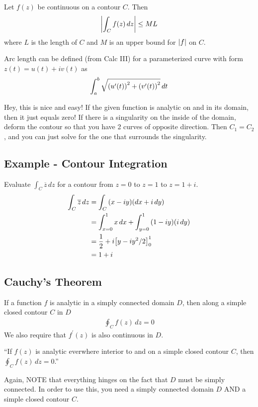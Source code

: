     \begin{thm}
        Let $f(z)$ be continuous on a contour $C$. Then
        \begin{align*}
            \left\lvert \int_C f(z) \, dz \right\rvert \le ML
        \end{align*}
        where $L$ is the length of $C$ and $M$ is an upper bound for
        $\left\lvert f \right\rvert$ on $C$.

        Arc length can be defined (from Calc III) for a parameterized curve
        with form $z(t) = u(t) + i v(t)$ as
        \begin{align*}
            \int_a^b \sqrt{{\left( u^\prime(t) \right)}^2 + {\left( v^\prime(t) \right)}^2} \, dt
        \end{align*}
    \end{thm}

    Hey, this is nice and easy! If the given function is analytic on and in
    its domain, then it just equals zero! If there is a singularity on the
    inside of the domain, deform the contour so that you have 2 curves of
    opposite direction. Then $C_1 = C_2$, and you can just solve for the one
    that surrounds the singularity.

    \subsection{Example - Contour Integration}
    Evaluate $\int_C \overline{z} \, dz$ for a contour from $z=0$ to $z=1$
    to $z=1+i$.
    \begin{align*}
        \int_C\overline{z}\,dz &= \int_C {\left( x - iy \right)}{\left( dx + i \, dy \right)}\\
        &= \int_{x=0}^1 x \, dx + \int_{y=0}^1 {\left( 1 - iy \right)}{\left( i \, dy \right)}\\
        &= \frac{1}{2} + i {\left[ y - iy^2 / 2 \right]}^1_0\\
        &= 1 + i
    \end{align*}

    \subsection{Cauchy's Theorem}

    \begin{thm}[Cauchy]
        If a function $f$ is analytic in a simply connected domain $D$, then
        along a simple closed contour $C$ in $D$
        \begin{align*}
            \oint_C f(z) \, dz = 0
        \end{align*}
        We also require that $f^\prime(z)$ is also continuous in $D$.

        ``If $f(z)$ is analytic everwhere interior to and on a simple closed
        contour $C$, then $\oint_C f(z) \, dz = 0$.''

        Again, NOTE that everything hinges on the fact that $D$ must be
        simply connected. In order to use this, you need a simply connected
        domain $D$ AND a simple closed contour $C$.
    \end{thm}

